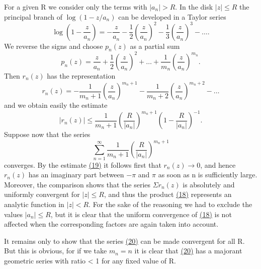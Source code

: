 For a given R we consider only the terms with $|a_{n}| > R$. In the disk $|z| \leq R$ the principal branch of $\log(1 - z/a_{n})$ can be developed in a Taylor series
\begin{equation*}
\log \left(1 - \frac {z}{a _ {n}}\right) = - \frac {z}{a _ {n}} - \frac {1}{2} \left(\frac {z}{a _ {n}}\right) ^ {2} - \frac {1}{3} \left(\frac {z}{a _ {n}}\right) ^ {3} - \dots .
\end{equation*}
We reverse the signs and choose $p_n(z)$ as a partial sum
\begin{equation*}
p _ {n} (z) = \frac {z}{a _ {n}} + \frac {1}{2} \left(\frac {z}{a _ {n}}\right) ^ {2} + \dots + \frac {1}{m _ {n}} \left(\frac {z}{a _ {n}}\right) ^ {m _ {n}}.
\end{equation*}
Then $r_n(z)$ has the representation
\begin{equation*}
r _ {n} (z) = - \frac {1}{m _ {n} + 1} \left(\frac {z}{a _ {n}}\right) ^ {m _ {n} + 1} - \frac {1}{m _ {n} + 2} \left(\frac {z}{a _ {n}}\right) ^ {m _ {n} + 2} - \dots
\end{equation*}
and we obtain easily the estimate
\begin{equation*}
\left| r _ {n} (z) \right| \leq \frac {1}{m _ {n} + 1} \left(\frac {R}{\left| a _ {n} \right|}\right) ^ {m _ {n} + 1} \left(1 - \frac {R}{\left| a _ {n} \right|}\right) ^ {- 1}.\tag{19}\label{eq:5.19}
\end{equation*}
Suppose now that the series
\begin{equation*}
\sum_ {n = 1} ^ {\infty} \frac {1}{m _ {n} + 1} \left(\frac {R}{| a _ {n} |}\right) ^ {m _ {n} + 1}\tag{20}\label{eq:5.20}
\end{equation*}
converges. By the estimate \hyperref[eq:5.19]{(19)} it follows first that $r_{n}(z) \to 0$, and hence $r_{n}(z)$ has an imaginary part between $-\pi$ and $\pi$ as soon as n is sufficiently large. Moreover, the comparison shows that the series $\Sigma r_{n}(z)$ is absolutely and uniformly convergent for $|z| \leq R$, and thus the product \hyperref[eq:5.18]{(18)} represents an analytic function in $|z| < R$. For the sake of the reasoning we had to exclude the values $|a_{n}| \leq R$, but it is clear that the uniform convergence of \hyperref[eq:5.18]{(18)} is not affected when the corresponding factors are again taken into account.

It remains only to show that the series \hyperref[eq:5.20]{(20)} can be made convergent for all R. But this is obvious, for if we take $m_{n} = n$ it is clear that \hyperref[eq:5.20]{(20)} has a majorant geometric series with ratio < 1 for any fixed value of R.

